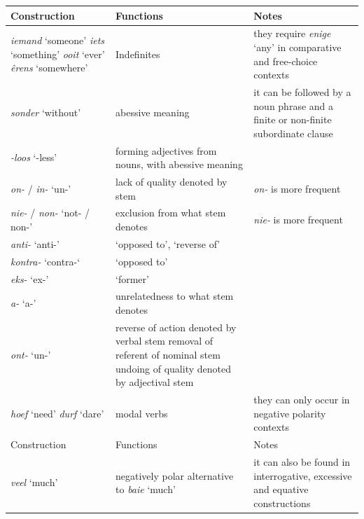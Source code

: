 \documentclass[output=paper,colorlinks,citecolor=brown]{langscibook}
\begin{document}
\begin{table} \footnotesize
\begin{tabularx}{\textwidth}{p{3cm}QQ}
\midrule
{Construction} & {Functions} & {Notes} \\
\midrule
\textit{iemand} ‘someone’
\newline \textit{iets} ‘something’
\newline \textit{ooit} ‘ever’
\newline \textit{êrens} ‘somewhere’
&
Indefinites
& they require \textit{enige} ‘any’ in comparative and free-choice contexts \\
\midrule
\textit{sonder} ‘without’ & abessive meaning & it can be followed by a noun phrase and a finite or non-finite subordinate clause \\
\midrule
\textit{-loos} ‘-less’ & forming adjectives from nouns, with abessive meaning & \\
\midrule

\textit{on-} / \textit{in-} ‘un-’ & lack of quality denoted by stem & \textit{on-} is more frequent \\
\midrule

\textit{nie-} / \textit{non-} ‘not- / non-’ & exclusion from what stem denotes & \textit{nie-} is more frequent \\
\midrule

\textit{anti-} ‘anti-’ & ‘opposed to’, ‘reverse of’ & \\
\midrule

\textit{kontra-} ‘contra-‘ & ‘opposed to’ & \\
\midrule

\textit{eks-} ‘ex-’ & ‘former’ & \\
\midrule

\textit{a-} ‘a-’ & unrelatedness to what stem denotes & \\
\midrule

\textit{ont-} ‘un-’ & reverse of action denoted by verbal stem
\newline removal of referent of nominal stem
\newline undoing of quality denoted by adjectival stem & \\
\midrule

\textit{hoef} ‘need’
\newline \textit{durf} ‘dare’ & modal verbs & they can only occur in negative polarity contexts \\
%
{Construction} & {Functions} & {Notes} \\
\midrule
\textit{veel} ‘much’ & negatively polar alternative to \textit{baie} ‘much’ & it can also be found in interrogative, excessive and equative constructions \\
\midrule


\end{tabularx}
\end{table}
\end{document}
